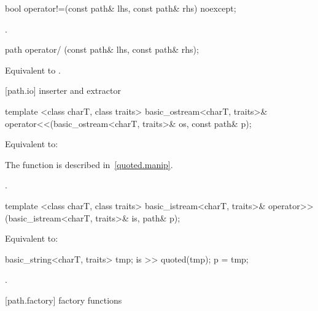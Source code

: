 %
\begin{itemdecl}
bool operator!=(const path& lhs, const path& rhs) noexcept;
\end{itemdecl}

\begin{itemdescr}
\pnum
\returns {}.
\end{itemdescr}

%
\begin{itemdecl}
path operator/ (const path& lhs, const path& rhs);
\end{itemdecl}

\begin{itemdescr}
\pnum
\effects Equivalent to .
\end{itemdescr}

[path.io]{ inserter and extractor}

%
\begin{itemdecl}
template <class charT, class traits>
  basic_ostream<charT, traits>&
    operator<<(basic_ostream<charT, traits>& os, const path& p);
\end{itemdecl}

\begin{itemdescr}
\pnum
\effects Equivalent to: 
\begin{note} The  function is described in~\ref{quoted.manip}. \end{note}

\pnum
\returns {}.
\end{itemdescr}

%
\begin{itemdecl}
template <class charT, class traits>
  basic_istream<charT, traits>&
    operator>>(basic_istream<charT, traits>& is, path& p);
\end{itemdecl}

\begin{itemdescr}
\pnum
\effects
Equivalent to:
\begin{codeblock}
basic_string<charT, traits> tmp;
is >> quoted(tmp);
p = tmp;
\end{codeblock}

\pnum
\returns {}.
\end{itemdescr}

[path.factory]{ factory functions}

